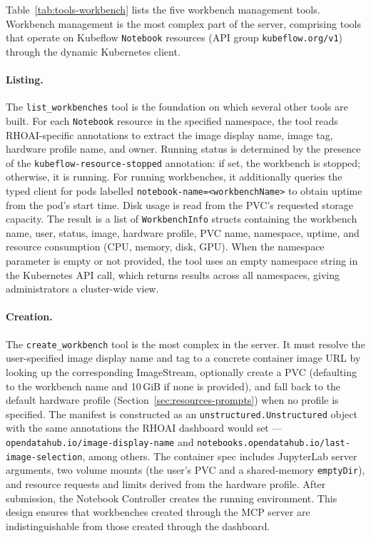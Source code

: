 \documentclass[
  digital,     %
  oneside,     %
  nosansbold,  %
  nocolorbold, %
  lof,         %
  lot,         %
]{fithesis4}
\begin{document}
Table~\ref{tab:tools-workbench} lists the five workbench management tools.
Workbench management is the most complex part of the server, comprising
tools that operate on Kubeflow
\texttt{Notebook} resources (API group \texttt{kubeflow.org/v1}) through
the dynamic Kubernetes client.

\paragraph{Listing.}
The \texttt{list\_workbenches} tool is the foundation on which several
other tools are built. For each \texttt{Notebook} resource in the specified
namespace, the tool reads RHOAI-specific annotations to extract the
image display name, image tag, hardware profile
name, and owner. Running status is determined by the presence of the
\texttt{kubeflow-resource-\allowbreak stopped} annotation: if set, the workbench is
stopped; otherwise, it is running. For running workbenches, it
additionally queries the typed client for pods labelled
\texttt{notebook-name=\allowbreak <workbenchName>} to obtain uptime from the pod's
start time. Disk usage is read from the PVC's requested storage capacity.
The result is a list of \texttt{WorkbenchInfo} structs containing the
workbench name, user, status, image, hardware profile, PVC name, namespace,
uptime, and resource consumption (CPU, memory, disk, GPU). When the
namespace parameter is empty or not provided, the tool uses an empty
namespace string in the Kubernetes API call, which returns results across all
namespaces, giving administrators a cluster-wide view.

\paragraph{Creation.}
The \texttt{create\_workbench} tool is the most complex in the server.
It
must resolve the user-specified image display name and tag to a concrete
container image URL by looking up the corresponding ImageStream, optionally
create a PVC (defaulting to the workbench name and 10\,GiB if none is
provided), and fall back to the default hardware profile
(Section~\ref{sec:resources-prompts}) when no profile is specified. The
manifest is constructed as an \texttt{unstructured.\allowbreak Unstructured} object
with the same annotations the RHOAI dashboard would set ---
\texttt{opendatahub.io/\allowbreak image-display-name} and
\texttt{notebooks.opendatahub.io/\allowbreak last-image-selection},
among others. The
container spec includes JupyterLab server arguments, two volume mounts
(the user's PVC and a shared-memory \texttt{emptyDir}), and resource
requests and limits derived from the hardware profile. After submission,
the Notebook Controller creates the running environment. This design
ensures that workbenches created through the MCP server are
indistinguishable from those created through the dashboard.
\end{document}
